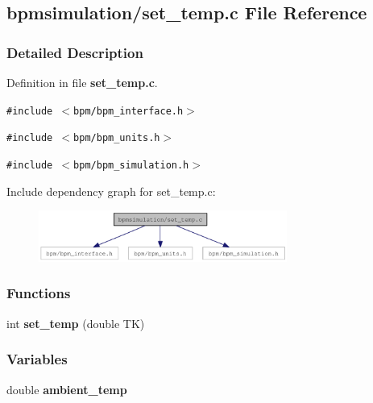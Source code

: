 \subsection{bpmsimulation/set\_\-temp.c File Reference}
\label{set__temp_8c}


\subsubsection{Detailed Description}


Definition in file {\bf set\_\-temp.c}.

{\tt \#include $<$bpm/bpm\_\-interface.h$>$}\par
{\tt \#include $<$bpm/bpm\_\-units.h$>$}\par
{\tt \#include $<$bpm/bpm\_\-simulation.h$>$}\par


Include dependency graph for set\_\-temp.c:\nopagebreak
\begin{figure}[H]
\begin{center}
\leavevmode
\includegraphics[width=231pt]{set__temp_8c__incl}
\end{center}
\end{figure}
\subsubsection*{Functions}
\begin{CompactItemize}
\item 
int {\bf set\_\-temp} (double TK)
\end{CompactItemize}
\subsubsection*{Variables}
\begin{CompactItemize}
\item 
double \textbf{ambient\_\-temp}\label{set__temp_8c_cf306f88809906ae9158ceba5a4f39b8}

\end{CompactItemize}
